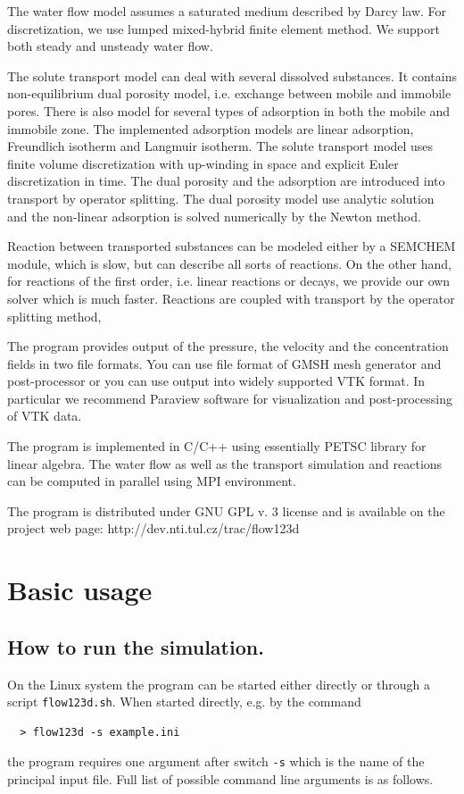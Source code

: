 \documentclass[12pt,a4paper]{report}
\begin{document}
The water flow model assumes a saturated medium described by Darcy law. For discretization, we use lumped mixed-hybrid finite element method.
We support both steady and unsteady water flow.

The solute transport model can deal with several dissolved substances. It contains non-equilibrium dual porosity model, 
i.e. exchange between mobile and immobile 
pores. There is also model for several types of adsorption in both the mobile and immobile zone. The implemented adsorption models are
linear adsorption, Freundlich isotherm and Langmuir isotherm. The solute transport model uses finite volume discretization 
with up-winding in space and explicit Euler discretization in time. The dual porosity and the adsorption are introduced into transport by operator splitting.
The dual porosity model use analytic solution and the non-linear adsorption is solved numerically by the Newton method.

Reaction between transported substances can be modeled either by a SEMCHEM module, which is slow, but can describe all sorts of reactions. On the other hand,
for reactions of the first order, i.e. linear reactions or decays, we provide our own solver which is much faster. Reactions are coupled with transport 
by the operator splitting method,

The program provides output of the pressure, the velocity and the concentration fields in two file formats. You can use file format of GMSH mesh generator and post-processor 
or you can use output into widely supported VTK format. In particular we recommend Paraview software for visualization and post-processing of VTK data.

The program is implemented in C/C++ using essentially PETSC library for linear algebra. The water flow as well as the transport simulation and reactions can be computed 
in parallel using MPI environment. 

The program is distributed under GNU GPL v. 3 license and is available on the project web page:
http://dev.nti.tul.cz/trac/flow123d

\section{Basic usage}

\subsection{How to run the simulation.}
On the Linux system the program can be started either directly or through a script \verb'flow123d.sh'. When started directly, e.g. by the command
\begin{verbatim}
  > flow123d -s example.ini
\end{verbatim}
the program requires one argument after switch \verb'-s' which is the name of the principal input file. Full list of possible command line arguments is as follows.
\end{document}
